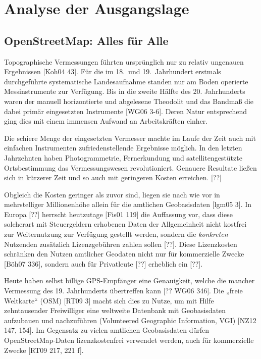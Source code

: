 \documentclass{../thesis}
\begin{document}
\chapter{Analyse der Ausgangslage}

\section{OpenStreetMap: Alles für Alle}

Topographische Vermessungen führten ursprünglich nur zu relativ ungenauen Ergebnissen [Koh04 43]. Für die im 18.~und 19.~Jahrhundert erstmals durchgeführte systematische Landesaufnahme standen nur am Boden operierte Messinstrumente zur Verfügung. Bis in die zweite Hälfte des 20. Jahrhunderts waren der manuell horizontierte und abgelesene Theodolit und das Bandmaß die dabei primär eingesetzten Instrumente [WG06 3-6]. Deren Natur entsprechend ging dies mit einem immensen Aufwand an Arbeitskräften einher.

Die schiere Menge der eingesetzten Vermesser machte im Laufe der Zeit auch mit einfachen Instrumenten zufriedenstellende Ergebnisse möglich. In den letzten Jahrzehnten haben Photogrammetrie, Fernerkundung und satellitengestützte Ortsbestimmung das Vermessungswesen revolutioniert. Genauere Resultate ließen sich in kürzerer Zeit und so auch mit geringeren Kosten erreichen. [??]


Obgleich die Kosten geringer als zuvor sind, liegen sie nach wie vor in mehrstelliger Millionenhöhe allein für die amtlichen Geobasisdaten [lgm05 3].
In Europa [??] herrscht heutzutage [Fis01 119] die Auffassung vor, dass diese solcherart mit Steuergeldern erhobenen Daten der Allgemeinheit nicht kostfrei zur Weiternutzung zur Verfügung gestellt werden, sondern die \emph{konkreten} Nutzenden zusätzlich Lizenzgebühren zahlen sollen [??]. Diese Lizenzkosten schränken den Nutzen amtlicher Geodaten nicht nur für kommerzielle Zwecke [Böh07 336], sondern auch für Privatleute [??] erheblich ein [??].


Heute haben selbst billige GPS-Empfänger eine Genauigkeit, welche die mancher Vermessung des 19. Jahrhunderts übertreffen kann [?? WG06 346]. Die „freie Weltkarte“  (OSM) [RT09 3] macht sich dies zu Nutze, um mit Hilfe zehntausender Freiwilliger eine weltweite Datenbank mit Geobasisdaten aufzubauen und nachzuführen (Volunteered Geographic Information, VGI) [NZ12 147, 154]. Im Gegensatz zu vielen amtlichen Geobasisdaten dürfen OpenStreetMap-Daten lizenzkostenfrei verwendet werden, auch für kommerzielle Zwecke [RT09 217, 221 f].
\end{document}

